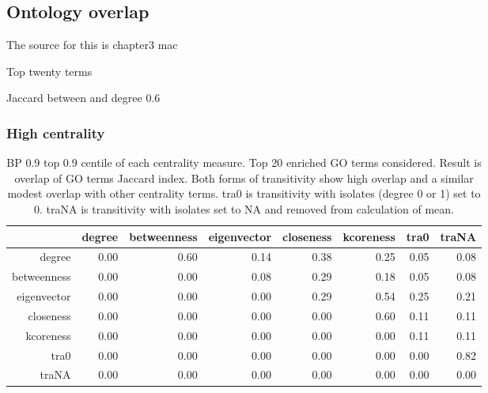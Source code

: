 \clearpage
\subsection{Ontology overlap}
\label{sec: ontology overlap}
The source for this is chapter3 mac

Top twenty terms

Jaccard between and degree 0.6

\subsubsection{High centrality}

\begin{table}[ht]
\centering
\begin{tabular}{rrrrrrrr}
  \hline
 & degree & betweenness & eigenvector & closeness & kcoreness & tra0 & traNA \\ 
  \hline
degree & 0.00 & 0.60 & 0.14 & 0.38 & 0.25 & 0.05 & 0.08 \\ 
  betweenness & 0.00 & 0.00 & 0.08 & 0.29 & 0.18 & 0.05 & 0.08 \\ 
  eigenvector & 0.00 & 0.00 & 0.00 & 0.29 & 0.54 & 0.25 & 0.21 \\ 
  closeness & 0.00 & 0.00 & 0.00 & 0.00 & 0.60 & 0.11 & 0.11 \\ 
  kcoreness & 0.00 & 0.00 & 0.00 & 0.00 & 0.00 & 0.11 & 0.11 \\ 
  tra0 & 0.00 & 0.00 & 0.00 & 0.00 & 0.00 & 0.00 & 0.82 \\ 
  traNA & 0.00 & 0.00 & 0.00 & 0.00 & 0.00 & 0.00 & 0.00 \\ 
   \hline
\end{tabular}
\caption{BP 0.9 top 0.9 centile of each centrality measure. Top 20 enriched GO terms considered. Result is overlap of GO terms Jaccard index. Both forms of transitivity show high overlap and a similar modest overlap with other centrality terms. tra0 is transitivity with isolates (degree 0 or 1) set to 0. traNA is transitivity with isolates set to NA and removed from calculation of mean.} 
\end{table}

